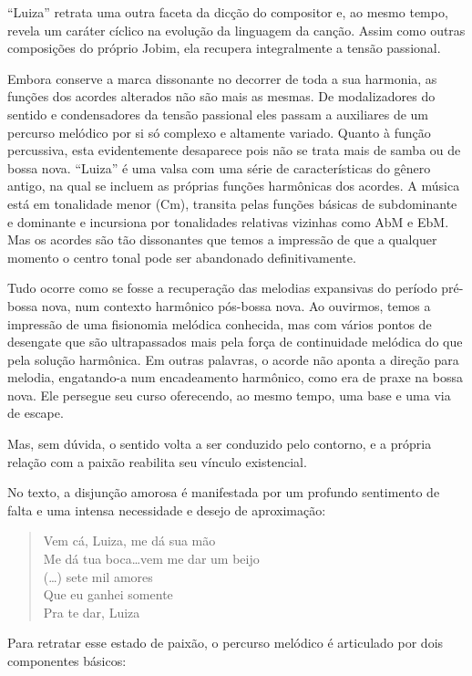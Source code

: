 ``Luiza'' retrata uma outra faceta da dicção do compositor e, ao mesmo
tempo, revela um caráter cíclico na evolução da linguagem da canção.
Assim como outras composições do próprio Jobim, ela recupera
integralmente a tensão passional.

Embora conserve a marca dissonante no decorrer de toda a sua harmonia,
as funções dos acordes alterados não são mais as mesmas. De
modalizadores do sentido e condensadores da tensão passional eles passam
a auxiliares de um percurso melódico por si só complexo e altamente
variado. Quanto à função percussiva, esta evidentemente desaparece pois
não se trata mais de samba ou de bossa nova. ``Luiza'' é uma valsa com uma
série de características do gênero antigo, na qual se incluem as
próprias funções harmônicas dos acordes. A música está em tonalidade
menor (Cm), transita pelas funções básicas de subdominante e dominante
e incursiona por tonalidades relativas vizinhas como AbM e EbM. Mas os
acordes são tão dissonantes que temos a impressão de que a qualquer
momento o centro tonal pode ser abandonado definitivamente.

Tudo ocorre como se fosse a recuperação das melodias expansivas do
período pré-bossa nova, num contexto harmônico pós-bossa nova. Ao
ouvirmos, temos a impressão de uma fisionomia melódica conhecida, mas
com vários pontos de desengate que são ultrapassados mais pela força de
continuidade melódica do que pela solução harmônica. Em outras palavras,
o acorde não aponta a direção para melodia, engatando-a num encadeamento
harmônico, como era de praxe na bossa nova. Ele persegue seu curso
oferecendo, ao mesmo tempo, uma base e uma via de escape.

Mas, sem dúvida, o sentido volta a ser conduzido pelo contorno, e a
própria relação com a paixão reabilita seu vínculo existencial.

No texto, a disjunção amorosa é manifestada por um profundo sentimento
de falta e uma intensa necessidade e desejo de aproximação:

\begin{verse}
\small{Vem cá, Luiza, me dá sua mão\\
Me dá tua boca\ldots vem me dar um beijo\\
(\ldots) sete mil amores\\
Que eu ganhei somente\\
Pra te dar, Luiza}
\end{verse}

Para retratar esse estado de paixão, o percurso melódico é articulado
por dois componentes básicos: 

